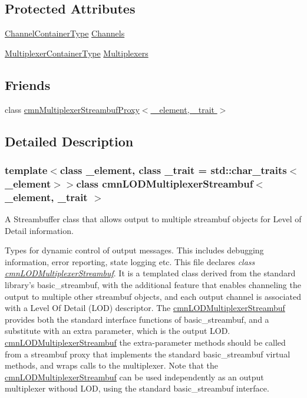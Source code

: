 \subsection*{Protected Attributes}
\begin{DoxyCompactItemize}
\item 
\hyperlink{classcmn_l_o_d_multiplexer_streambuf_a2fd9fe59de3be9b8cf5546ac2b0e41bb}{Channel\-Container\-Type} \hyperlink{classcmn_l_o_d_multiplexer_streambuf_a1a7cbbb28f587e83e402b6ea663bd387}{Channels}
\item 
\hyperlink{classcmn_l_o_d_multiplexer_streambuf_abddd0ebc7e720ea977f857c6350dd5a0}{Multiplexer\-Container\-Type} \hyperlink{classcmn_l_o_d_multiplexer_streambuf_a775d4551d9e37fcca0c27f699a98b838}{Multiplexers}
\end{DoxyCompactItemize}
\subsection*{Friends}
\begin{DoxyCompactItemize}
\item 
class \hyperlink{classcmn_l_o_d_multiplexer_streambuf_a05956cbff9ce3ca1513e6c4e8fd7acd8}{cmn\-Multiplexer\-Streambuf\-Proxy$<$ \-\_\-element, \-\_\-trait $>$}
\end{DoxyCompactItemize}


\subsection{Detailed Description}
\subsubsection*{template$<$class \-\_\-element, class \-\_\-trait = std\-::char\-\_\-traits$<$\-\_\-element$>$$>$class cmn\-L\-O\-D\-Multiplexer\-Streambuf$<$ \-\_\-element, \-\_\-trait $>$}

A Streambuffer class that allows output to multiple streambuf objects for Level of Detail information. 

Types for dynamic control of output messages. This includes debugging information, error reporting, state logging etc. This file declares {\itshape class \hyperlink{classcmn_l_o_d_multiplexer_streambuf}{cmn\-L\-O\-D\-Multiplexer\-Streambuf}}. It is a templated class derived from the standard library's basic\-\_\-streambuf, with the additional feature that enables channeling the output to multiple other streambuf objects, and each output channel is associated with a Level Of Detail (L\-O\-D) descriptor. The \hyperlink{classcmn_l_o_d_multiplexer_streambuf}{cmn\-L\-O\-D\-Multiplexer\-Streambuf} provides both the standard interface functions of basic\-\_\-streambuf, and a substitute with an extra parameter, which is the output L\-O\-D. \hyperlink{classcmn_l_o_d_multiplexer_streambuf}{cmn\-L\-O\-D\-Multiplexer\-Streambuf} the extra-\/parameter methods should be called from a streambuf proxy that implements the standard basic\-\_\-streambuf virtual methods, and wraps calls to the multiplexer. Note that the \hyperlink{classcmn_l_o_d_multiplexer_streambuf}{cmn\-L\-O\-D\-Multiplexer\-Streambuf} can be used independently as an output multiplexer withoud L\-O\-D, using the standard basic\-\_\-streambuf interface.

